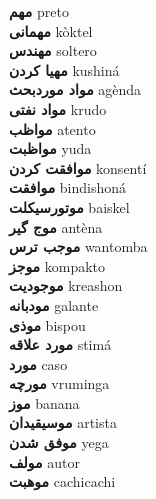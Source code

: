 \textbf{ مهم  } preto \\
\textbf{ مهمانی  } kòktel \\
\textbf{ مهندس  } soltero \\
\textbf{ مهیا کردن  } kushiná \\
\textbf{ مواد موردبحث  } agènda \\
\textbf{ مواد نفتی  } krudo \\
\textbf{ مواظب  } atento \\
\textbf{ مواظبت  } yuda \\
\textbf{ موافقت کردن  } konsentí \\
\textbf{ موافقت  } bindishoná \\
\textbf{ موتورسیکلت  } baiskel \\
\textbf{ موج گیر  } antèna \\
\textbf{ موجب ترس  } wantomba \\
\textbf{ موجز  } kompakto \\
\textbf{ موجودیت  } kreashon \\
\textbf{ مودبانه  } galante \\
\textbf{ موذی  } bispou \\
\textbf{ مورد علاقه  } stimá \\
\textbf{ مورد  } caso \\
\textbf{ مورچه  } vruminga \\
\textbf{ موز  } banana \\
\textbf{ موسیقیدان  } artista \\
\textbf{ موفق شدن  } yega \\
\textbf{ مولف  } autor \\
\textbf{ موهبت  } cachicachi \\
